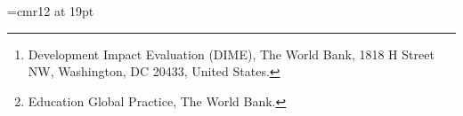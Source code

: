 \documentclass[11pt,a4paper]{article}
\begin{document}
	
	
	\font\myfont=cmr12 at 19pt
	\title{}
	
	\newcommand*\samethanks[1][\value{footnote}]{\footnotemark[#1]}
	
	\author{%
		Caio Piza\thanks{Development Impact Evaluation (DIME), The World Bank, 1818 H Street NW, Washington, DC 20433, United States.}%
		\and Astrid Zwager\samethanks[2]%
		\and Andre Loureiro\thanks{Education Global Practice, The World Bank.}%
		\and Rafael Dantas\samethanks[2]%
		\and Matteo Ruzzante\samethanks[2]
	}
	
	\date{}
	
	\maketitle
	
	\vspace{1cm}
	\listoffigures
	\listoftables
	
	
	\newpage
	\sloppy
	
	\doublespacing
	
	\setlength\parskip{1em}
	\setlength\parindent{0pt}
	
	
	
	\pgfplotsset{compat=1.15}
	
	
	\newpage
	\renewcommand{\thetable}{C\arabic{table}}
	\renewcommand{\thefigure}{C\arabic{figure}}
	
\end{document}
